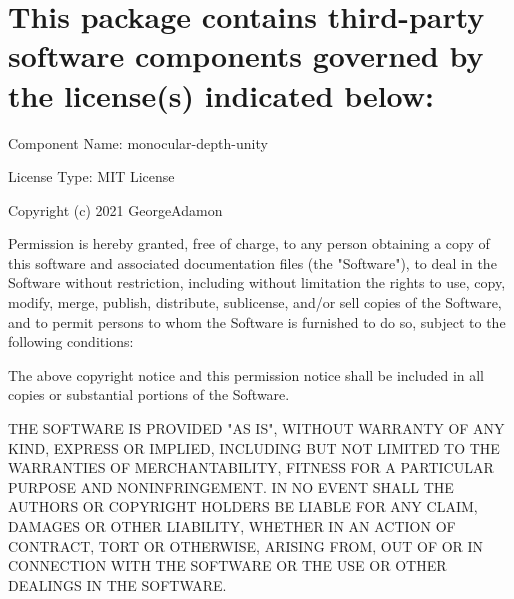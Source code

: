 \chapter{This package contains third-\/party software components governed by the license(s) indicated below\+:}
\hypertarget{md_docs_2src_2client_2_packages_2com_8doji_8genesis_2_third_01_party_01_notices}{}\label{md_docs_2src_2client_2_packages_2com_8doji_8genesis_2_third_01_party_01_notices}
Component Name\+: monocular-\/depth-\/unity

License Type\+: MIT License

Copyright (c) 2021 George\+Adamon

Permission is hereby granted, free of charge, to any person obtaining a copy of this software and associated documentation files (the "{}\+Software"{}), to deal in the Software without restriction, including without limitation the rights to use, copy, modify, merge, publish, distribute, sublicense, and/or sell copies of the Software, and to permit persons to whom the Software is furnished to do so, subject to the following conditions\+:

The above copyright notice and this permission notice shall be included in all copies or substantial portions of the Software.

THE SOFTWARE IS PROVIDED "{}\+AS IS"{}, WITHOUT WARRANTY OF ANY KIND, EXPRESS OR IMPLIED, INCLUDING BUT NOT LIMITED TO THE WARRANTIES OF MERCHANTABILITY, FITNESS FOR A PARTICULAR PURPOSE AND NONINFRINGEMENT. IN NO EVENT SHALL THE AUTHORS OR COPYRIGHT HOLDERS BE LIABLE FOR ANY CLAIM, DAMAGES OR OTHER LIABILITY, WHETHER IN AN ACTION OF CONTRACT, TORT OR OTHERWISE, ARISING FROM, OUT OF OR IN CONNECTION WITH THE SOFTWARE OR THE USE OR OTHER DEALINGS IN THE SOFTWARE. 